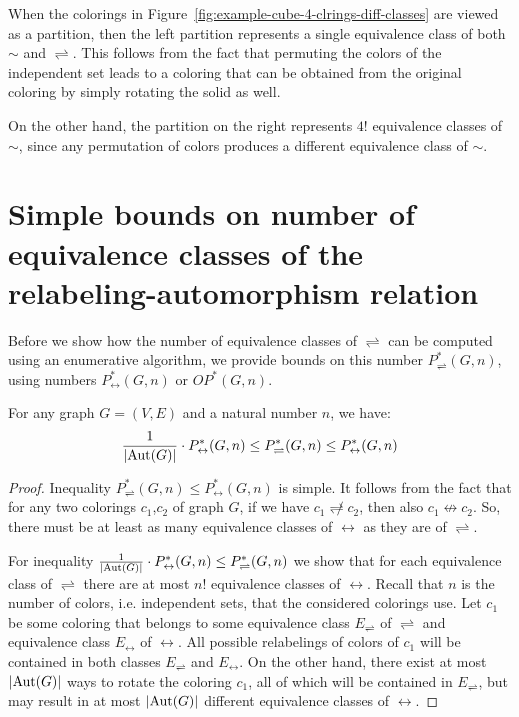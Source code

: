 When the colorings in Figure~\ref{fig:example-cube-4-clrings-diff-classes} are viewed as a partition, then the left partition represents a single equivalence class of both $\sim$ and $\rightleftharpoons$. This follows from the fact that permuting the colors of the independent set leads to a coloring that can be obtained from the original coloring by simply rotating the solid as well.

On the other hand, the partition on the right represents $4!$ equivalence classes of $\sim$, since any permutation of colors produces a different equivalence class of $\sim$.

\section{Simple bounds on number of equivalence classes of the relabeling-automorphism relation}

Before we show how the number of equivalence classes of $\rightleftharpoons$ can be computed using an enumerative algorithm, we provide bounds on this number $P^*_\rightleftharpoons(G,n)$, using numbers $P^*_\leftrightarrow(G,n)$ or $OP^*(G,n)$.

\begin{claim}\label{clm:relabeling-bound}
    For any graph $G=(V,E)$ and a natural number $n$, we have: $$\frac{1}{\left|{\operatorname{Aut}(G)}\right|} \cdot P^*_\leftrightarrow(G,n) \leq P^*_\rightleftharpoons(G,n) \leq P^*_\leftrightarrow(G,n)$$ 
\end{claim}

\begin{proof}

Inequality $P^*_\rightleftharpoons(G,n) \leq P^*_\leftrightarrow(G,n)$ is simple. It follows from the fact that for any two colorings $c_1$,$c_2$ of graph $G$, if we have $c_1 \not\rightleftharpoons c_2$, then also $c_1 \not\leftrightarrow c_2$. So, there must be at least as many equivalence classes of $\leftrightarrow$ as they are of $\rightleftharpoons$.

For inequality $\frac{1}{\left|{\operatorname{Aut}(G)}\right|} \cdot P^*_\leftrightarrow(G,n) \leq P^*_\rightleftharpoons(G,n)$ we show that for each equivalence class of $\rightleftharpoons$ there are at most $n!$ equivalence classes of $\leftrightarrow$. Recall that $n$ is the number of colors, i.e. independent sets, that the considered colorings use. Let $c_1$ be some coloring that belongs to some equivalence class $E_\rightleftharpoons$ of $\rightleftharpoons$ and equivalence class $E_\leftrightarrow$ of $\leftrightarrow$. All possible relabelings of colors of $c_1$ will be contained in both classes $E_\rightleftharpoons$ and $E_\leftrightarrow$. On the other hand, there exist at most $\left|{\operatorname{Aut}(G)}\right|$ ways to rotate the coloring $c_1$, all of which will be contained in $E_\rightleftharpoons$, but may result in at most $\left|{\operatorname{Aut}(G)}\right|$ different equivalence classes of $\leftrightarrow$.

\end{proof}

